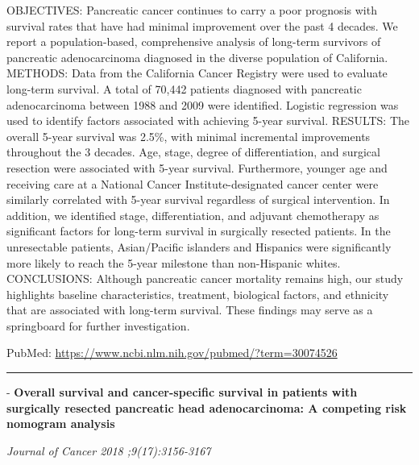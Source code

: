 \documentclass[]{article}
\begin{document}
OBJECTIVES: Pancreatic cancer continues to carry a poor prognosis with
survival rates that have had minimal improvement over the past 4
decades. We report a population-based, comprehensive analysis of
long-term survivors of pancreatic adenocarcinoma diagnosed in the
diverse population of California. METHODS: Data from the California
Cancer Registry were used to evaluate long-term survival. A total of
70,442 patients diagnosed with pancreatic adenocarcinoma between 1988
and 2009 were identified. Logistic regression was used to identify
factors associated with achieving 5-year survival. RESULTS: The overall
5-year survival was 2.5\%, with minimal incremental improvements
throughout the 3 decades. Age, stage, degree of differentiation, and
surgical resection were associated with 5-year survival. Furthermore,
younger age and receiving care at a National Cancer Institute-designated
cancer center were similarly correlated with 5-year survival regardless
of surgical intervention. In addition, we identified stage,
differentiation, and adjuvant chemotherapy as significant factors for
long-term survival in surgically resected patients. In the unresectable
patients, Asian/Pacific islanders and Hispanics were significantly more
likely to reach the 5-year milestone than non-Hispanic whites.
CONCLUSIONS: Although pancreatic cancer mortality remains high, our
study highlights baseline characteristics, treatment, biological
factors, and ethnicity that are associated with long-term survival.
These findings may serve as a springboard for further investigation.

PubMed: \url{https://www.ncbi.nlm.nih.gov/pubmed/?term=30074526}

{}

{}

\begin{center}\rule{0.5\linewidth}{\linethickness}\end{center}

 - \textbf{Overall survival and cancer-specific survival in patients
with surgically resected pancreatic head adenocarcinoma: A competing
risk nomogram analysis}

\emph{Journal of Cancer 2018 ;9(17):3156-3167}
\end{document}

